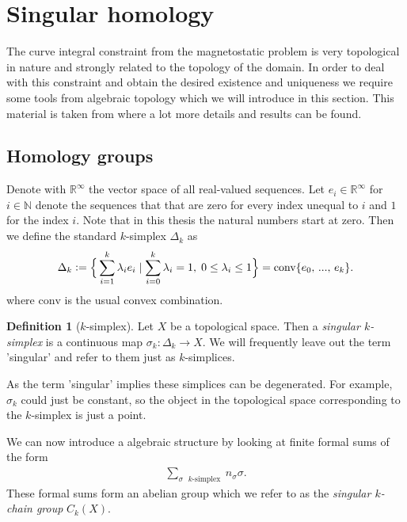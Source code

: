 \documentclass[12pt,a4paper]{article}
\numberwithin{equation}{subsection}
\numberwithin{lemma}{subsection}
\theoremstyle{definition}
\newtheorem{definition}[lemma]{Definition}
\newcommand{\naturalnum}{\mathbb{N}}
\newcommand{\real}{\mathbb{R}}
\begin{document}
\section{Singular homology}\label{sec:singular_homology}

The curve integral constraint from the magnetostatic problem is very topological %
in nature and strongly related to the topology of the domain. 
In order to deal with this constraint and obtain the desired existence and
uniqueness we require some tools from algebraic topology which we will introduce 
in this section. 
This material is taken from
\cite{topology_and_geometry} where a lot more details and results can be found.

\subsection{Homology groups}

Denote with $\real^\infty$ the vector space of all real-valued sequences. Let 
$e_i \in \real^\infty$ for $i \in \naturalnum$ denote the sequences that 
that are zero for every index 
unequal to $i$ and $1$ for the index $i$. Note that in this thesis 
the natural numbers start at zero. Then we define the standard $k$-simplex 
$\Delta_k$ as
\begin{align*}
    \Delta_k \vcentcolon= \Big\{ \sum\limits_{i=1}^k  \lambda_i e_i \mid 
    \sum\limits_{i=0}^k \lambda_i = 1 , \; 0\leq \lambda_i \leq 1\Big\}
    = \text{conv} \{e_0,\,...,\, e_k\}.
\end{align*}
where $\text{conv}$ is the usual convex combination. 

\begin{definition}[$k$-simplex]
Let $X$ be a topological space. Then a \textit{singular $k$-simplex} is a continuous 
map $\sigma_k: \Delta_k \rightarrow X$. We will frequently leave out the term 'singular'
and refer to them just as $k$-simplices.
\end{definition}

As the term 'singular' implies these simplices can be degenerated. For example, $\sigma_k$ could 
just be constant, so the object in the topological space corresponding to the 
$k$-simplex is just a point.

We can now introduce a algebraic structure by looking at finite formal sums of the form 
\begin{align*}
    \sum_{\text{$\sigma$ $k$-simplex }} n_\sigma \sigma.
\end{align*}
These formal sums form an abelian group which we refer to as the 
\textit{singular $k$-chain group} $C_k(X)$. 
\end{document}
